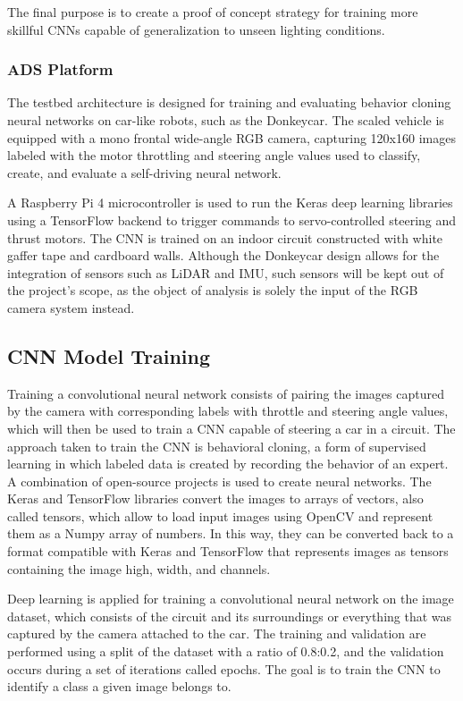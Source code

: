 \documentclass[12pt]{article}
\begin{document}
The final purpose is to create a proof of concept strategy for training more skillful CNNs capable of generalization to unseen lighting conditions. 

\subsubsection{ADS Platform}

The testbed architecture is designed for training and evaluating behavior cloning neural networks on car-like robots, such as the Donkeycar. The scaled vehicle is equipped with a mono frontal wide-angle RGB camera, capturing 120x160  images labeled with the motor throttling and steering angle values used to classify, create, and evaluate a self-driving neural network. 

A Raspberry Pi 4 microcontroller is used to run the Keras deep learning libraries using a TensorFlow backend to trigger commands to servo-controlled steering and thrust motors. The CNN is trained on an indoor circuit constructed with white gaffer tape and cardboard walls. Although the Donkeycar design allows for the integration of sensors such as LiDAR and IMU, such sensors will be kept out of the project's scope, as the object of analysis is solely the input of the RGB camera system instead.

\subsection{CNN Model Training}

Training a convolutional neural network consists of pairing the images captured by the camera with corresponding labels with throttle and steering angle values, which will then be used to train a CNN capable of steering a car in a circuit. The approach taken to train the CNN is behavioral cloning, a form of supervised learning in which labeled data is created by recording the behavior of an expert. A combination of open-source projects is used to create neural networks. The Keras and TensorFlow libraries convert the images to arrays of vectors, also called tensors, which allow to load input images using OpenCV and represent them as a Numpy array of numbers. In this way, they can be converted back to a format compatible with Keras and TensorFlow that represents images as tensors containing the image high, width, and channels.

Deep learning is applied for training a convolutional neural network on the image dataset, which consists of the circuit and its surroundings or everything that was captured by the camera attached to the car. The training and validation are performed using a split of the dataset with a ratio of 0.8:0.2, and the validation occurs during a set of iterations called epochs. The goal is to train the CNN to identify a class a given image belongs to.
\end{document}
